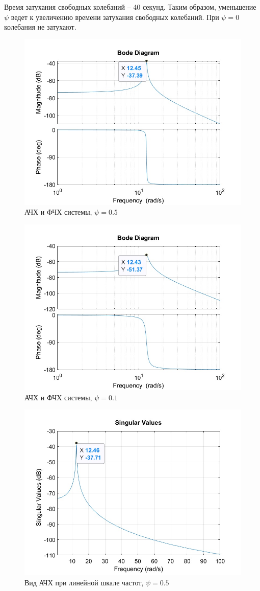 \documentclass{article}
\begin{document}
	Время затухания свободных колебаний -- 40 секунд.
	Таким образом, уменьшение $\psi$ ведет к увеличению времени затухания свободных колебаний. При $\psi = 0$ колебания не затухают.
	\begin{figure}[H]
		\centering
		\includegraphics[width=0.7\linewidth]{graph4}
		\caption{АЧХ и ФЧХ системы, $\psi = 0.5$}
		\label{fig:graph4}
	\end{figure}
	\begin{figure}[H]
		\centering
		\includegraphics[width=0.7\linewidth]{graph5}
		\caption{АЧХ и ФЧХ системы, $\psi = 0.1$}
		\label{fig:graph5}
	\end{figure}
	\begin{figure}
		\centering
		\includegraphics[width=0.7\linewidth]{graph6}
		\caption{Вид АЧХ при линейной шкале частот, $\psi = 0.5$}
		\label{fig:graph6}
	\end{figure}
\end{document}
